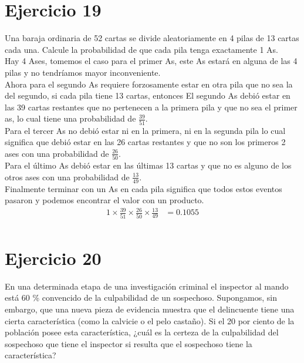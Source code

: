 \documentclass[12pt]{article}
\begin{document}
\section{Ejercicio 19}
Una baraja ordinaria de 52 cartas se divide aleatoriamente en 4 pilas de 13 cartas cada una.
Calcule la probabilidad de que cada pila tenga exactamente 1 As.\\
Hay 4 Ases, tomemos el caso para el primer As, este As estará en alguna de las 4 pilas y no tendríamos mayor inconveniente.\\
Ahora para el segundo As requiere forzosamente estar en otra pila que no sea la del segundo, si cada pila tiene 13 cartas, entonces El segundo As debió estar en las 39 cartas restantes que no pertenecen a la primera pila y que no sea el primer as, lo cual tiene una probabilidad de $\frac{39}{51}$.\\
Para el tercer As no debió estar ni en la primera, ni en la segunda pila lo cual significa que debió estar en las 26 cartas restantes y que no son los primeros 2 ases con una probabilidad de $\frac{26}{50}$.\\
Para el último As debió estar en las últimas 13 cartas y que no es alguno de los otros ases con una probabilidad de $\frac{13}{49}$.\\
Finalmente terminar con un As en cada pila significa que todos estos eventos pasaron y podemos encontrar el valor con un producto.
\begin{equation}
\begin{split}
	1 \times \frac{39}{51} \times \frac{26}{50} \times \frac{13}{49} &= 0.1055\\	
\end{split}
\end{equation}
\section{Ejercicio 20}
 En una determinada etapa de una investigación criminal el inspector al mando está 60 \%
convencido de la culpabilidad de un sospechoso. Supongamos, sin embargo, que una nueva
pieza de evidencia muestra que el delincuente tiene una cierta característica (como la calvicie
o el pelo castaño). Si el 20 por ciento de la población posee esta característica, ¿cuál es la
certeza de la culpabilidad del sospechoso que tiene el inspector si resulta que el sospechoso
tiene la característica?\\
\end{document}
